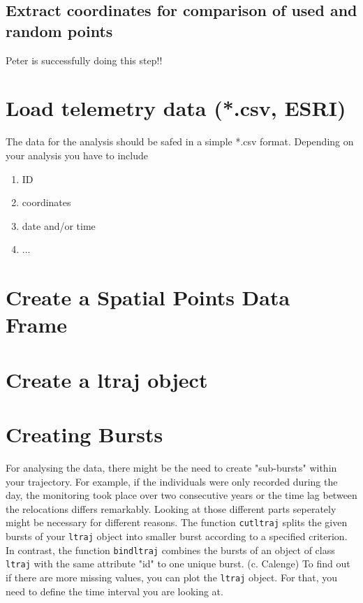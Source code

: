 \documentclass[11pt, a4paper]{article}\usepackage[]{graphicx}\usepackage[]{color}
\begin{document}
\subsection{Extract coordinates for comparison of used and random points} %
Peter is successfully doing this step!!

\section{Load telemetry data (*.csv, ESRI)}%
The data for the analysis should be safed in a simple *.csv format. Depending on your analysis you have to include 
\begin{enumerate}
\item{ID}
\item{coordinates}
\item{date and/or time}
\item{...}
\end{enumerate}



\section{Create a Spatial Points Data Frame}%

\section{Create a ltraj object}%


\section{Creating Bursts}%

For analysing the data, there might be the need to create "sub-bursts" within your trajectory. For example, if the individuals were only recorded during the day, the monitoring took place over two consecutive years or the time lag between the relocations differs remarkably. Looking at those different parts seperately might be necessary for different reasons. The function \texttt{cutltraj} splits the given bursts of your \texttt{ltraj} object into smaller burst according to a specified criterion. In contrast, the function \texttt{bindltraj} combines the bursts of an object of class \texttt{ltraj} with the same attribute "id" to one unique burst. (c. Calenge) To find out if there are more missing values, you can plot the \texttt{ltraj} object. For that, you need to define the time interval you are looking at. 
\end{document}
